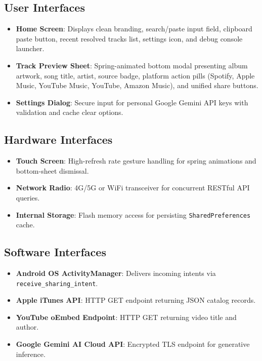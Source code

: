 \documentclass[12pt,a4paper]{report}
\begin{document}
\subsection{User Interfaces}
\begin{itemize}
    \item \textbf{Home Screen}: Displays clean branding, search/paste input field, clipboard paste button, recent resolved tracks list, settings icon, and debug console launcher.
    \item \textbf{Track Preview Sheet}: Spring-animated bottom modal presenting album artwork, song title, artist, source badge, platform action pills (Spotify, Apple Music, YouTube Music, YouTube, Amazon Music), and unified share buttons.
    \item \textbf{Settings Dialog}: Secure input for personal Google Gemini API keys with validation and cache clear options.
\end{itemize}

\subsection{Hardware Interfaces}
\begin{itemize}
    \item \textbf{Touch Screen}: High-refresh rate gesture handling for spring animations and bottom-sheet dismissal.
    \item \textbf{Network Radio}: 4G/5G or WiFi transceiver for concurrent RESTful API queries.
    \item \textbf{Internal Storage}: Flash memory access for persisting \texttt{SharedPreferences} cache.
\end{itemize}

\subsection{Software Interfaces}
\begin{itemize}
    \item \textbf{Android OS ActivityManager}: Delivers incoming intents via \texttt{receive\_sharing\_intent}.
    \item \textbf{Apple iTunes API}: HTTP GET endpoint returning JSON catalog records.
    \item \textbf{YouTube oEmbed Endpoint}: HTTP GET returning video title and author.
    \item \textbf{Google Gemini AI Cloud API}: Encrypted TLS endpoint for generative inference.
\end{itemize}
\end{document}

